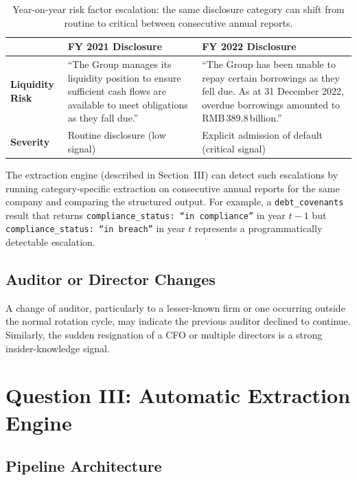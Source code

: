 \documentclass[12pt,a4paper]{article}
\begin{document}
\begin{table}[H]
\centering
\begin{tabular}{>{\bfseries}p{2cm} p{5.5cm} p{5.5cm}}
\toprule
& \textbf{FY 2021 Disclosure} & \textbf{FY 2022 Disclosure} \\
\midrule
Liquidity Risk &
\small ``The Group manages its liquidity position to ensure
sufficient cash flows are available to meet obligations as they
fall due.'' &
\small ``The Group has been unable to repay certain borrowings
as they fell due. As at 31 December 2022, overdue borrowings
amounted to RMB\,389.8\,billion.'' \\
\addlinespace
Severity & \small Routine disclosure (low signal) &
\small \textcolor{codered}{Explicit admission of default (critical signal)} \\
\bottomrule
\end{tabular}
\caption{Year-on-year risk factor escalation: the same disclosure category can
shift from routine to critical between consecutive annual reports.}
\end{table}

\noindent The extraction engine (described in Section~III) can detect such
escalations by running category-specific extraction on consecutive annual
reports for the same company and comparing the structured output. For example,
a \texttt{debt\_covenants} result that returns
\texttt{compliance\_status: ``in compliance''} in year $t-1$ but
\texttt{compliance\_status: ``in breach''} in year $t$ represents a
programmatically detectable escalation.

\subsection{Auditor or Director Changes}

A change of auditor, particularly to a lesser-known firm or one occurring outside the
normal rotation cycle, may indicate the previous auditor declined to continue.
Similarly, the sudden resignation of a CFO or multiple directors is a strong
insider-knowledge signal.

\section{Question III: Automatic Extraction Engine}

\subsection{Pipeline Architecture}
\end{document}
